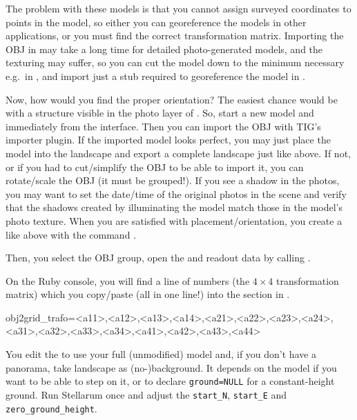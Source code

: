 The problem with these models is that you cannot assign surveyed
coordinates to points in the model, so either you can georeference the
models in other applications, or you must find the correct
transformation matrix.  Importing the OBJ in  may take a long
time for detailed photo-generated models, and the texturing may
suffer, so you can cut the model down to the minimum necessary e.g.\ in
, and import just a stub required to georeference the model in
. 

Now, how would you find the proper orientation? The easiest chance
would be with a structure visible in the photo layer of . So, start a new model and immediately  from the
 interface. Then you can import the OBJ with TIG's importer
plugin.  If the imported model looks perfect, you may just place the
model into the  landscape and export a complete landscape just
like above. If not, or if you had to cut/simplify the OBJ to be able
to import it, you can rotate/scale the OBJ (it must be grouped!). If
you see a shadow in the photos, you may want to set the date/time of
the original photos in the scene and verify that the shadows created by
 illuminating the model match those in the model's photo
texture. When you are satisfied with placement/orientation, you create
a  like above with the command
.

Then, you select the OBJ group, open the  and readout data by calling
.

On the Ruby console, you will find a line of numbers (the $4\times4$
transformation matrix) which you copy/paste (all in one line!) into the
\file{[model]} section in .
\begin{configfile}
obj2grid_trafo=<a11>,<a12>,<a13>,<a14>,<a21>,<a22>,<a23>,<a24>,
               <a31>,<a32>,<a33>,<a34>,<a41>,<a42>,<a43>,<a44>
\end{configfile}
You edit the  to use your full (unmodified)
 model and, if you don't have a panorama, take 
landscape as (no-)background. It depends on the model if you want to
be able to step on it, or to declare \texttt{ground=NULL} for a
constant-height ground. Run Stellarum once and adjust the
\texttt{start\_N}, \texttt{start\_E} and \texttt{zero\_ground\_height}.

